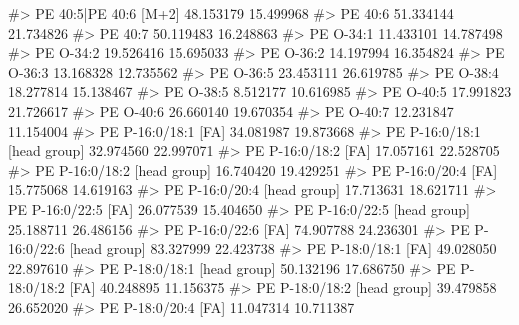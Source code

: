 \documentclass[
  letterpaper,
  DIV=11,
  numbers=noendperiod]{scrreprt}
\newenvironment{Shaded}{\begin{snugshade}}{\end{snugshade}}
\newcommand{\CommentTok}[1]{\textcolor[rgb]{0.37,0.37,0.37}{#1}}
\begin{document}
\begin{Shaded}
\begin{Highlighting}[]
\CommentTok{\#\textgreater{} PE 40:5|PE 40:6 [M+2]                     48.153179 15.499968}
\CommentTok{\#\textgreater{} PE 40:6                                   51.334144 21.734826}
\CommentTok{\#\textgreater{} PE 40:7                                   50.119483 16.248863}
\CommentTok{\#\textgreater{} PE O{-}34:1                                 11.433101 14.787498}
\CommentTok{\#\textgreater{} PE O{-}34:2                                 19.526416 15.695033}
\CommentTok{\#\textgreater{} PE O{-}36:2                                 14.197994 16.354824}
\CommentTok{\#\textgreater{} PE O{-}36:3                                 13.168328 12.735562}
\CommentTok{\#\textgreater{} PE O{-}36:5                                 23.453111 26.619785}
\CommentTok{\#\textgreater{} PE O{-}38:4                                 18.277814 15.138467}
\CommentTok{\#\textgreater{} PE O{-}38:5                                  8.512177 10.616985}
\CommentTok{\#\textgreater{} PE O{-}40:5                                 17.991823 21.726617}
\CommentTok{\#\textgreater{} PE O{-}40:6                                 26.660140 19.670354}
\CommentTok{\#\textgreater{} PE O{-}40:7                                 12.231847 11.154004}
\CommentTok{\#\textgreater{} PE P{-}16:0/18:1 [FA]                       34.081987 19.873668}
\CommentTok{\#\textgreater{} PE P{-}16:0/18:1 [head group]               32.974560 22.997071}
\CommentTok{\#\textgreater{} PE P{-}16:0/18:2 [FA]                       17.057161 22.528705}
\CommentTok{\#\textgreater{} PE P{-}16:0/18:2 [head group]               16.740420 19.429251}
\CommentTok{\#\textgreater{} PE P{-}16:0/20:4 [FA]                       15.775068 14.619163}
\CommentTok{\#\textgreater{} PE P{-}16:0/20:4 [head group]               17.713631 18.621711}
\CommentTok{\#\textgreater{} PE P{-}16:0/22:5 [FA]                       26.077539 15.404650}
\CommentTok{\#\textgreater{} PE P{-}16:0/22:5 [head group]               25.188711 26.486156}
\CommentTok{\#\textgreater{} PE P{-}16:0/22:6 [FA]                       74.907788 24.236301}
\CommentTok{\#\textgreater{} PE P{-}16:0/22:6 [head group]               83.327999 22.423738}
\CommentTok{\#\textgreater{} PE P{-}18:0/18:1 [FA]                       49.028050 22.897610}
\CommentTok{\#\textgreater{} PE P{-}18:0/18:1 [head group]               50.132196 17.686750}
\CommentTok{\#\textgreater{} PE P{-}18:0/18:2 [FA]                       40.248895 11.156375}
\CommentTok{\#\textgreater{} PE P{-}18:0/18:2 [head group]               39.479858 26.652020}
\CommentTok{\#\textgreater{} PE P{-}18:0/20:4 [FA]                       11.047314 10.711387}

\end{Highlighting}
\end{Shaded}
\end{document}

